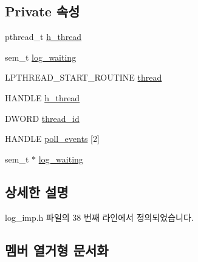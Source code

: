 \subsection*{Private 속성}
\begin{DoxyCompactItemize}
\item 
pthread\+\_\+t \hyperlink{classavdecc__lib_1_1log__imp_a6e4816698fce9da1e93d69ecbcc78506}{h\+\_\+thread}
\item 
sem\+\_\+t \hyperlink{classavdecc__lib_1_1log__imp_a5b9dda13ab4797605bff00be0df6d821}{log\+\_\+waiting}
\item 
L\+P\+T\+H\+R\+E\+A\+D\+\_\+\+S\+T\+A\+R\+T\+\_\+\+R\+O\+U\+T\+I\+NE \hyperlink{classavdecc__lib_1_1log__imp_aa930d342e4c53bcc9bf4da7995c81a3b}{thread}
\item 
H\+A\+N\+D\+LE \hyperlink{classavdecc__lib_1_1log__imp_a38f9e2153b3e3dadac999c7c45549cf6}{h\+\_\+thread}
\item 
D\+W\+O\+RD \hyperlink{classavdecc__lib_1_1log__imp_afb0cb0dfb6676a8802089b63ae981f37}{thread\+\_\+id}
\item 
H\+A\+N\+D\+LE \hyperlink{classavdecc__lib_1_1log__imp_a7178c7ad92d526f120bd0ae68b50f53e}{poll\+\_\+events} \mbox{[}2\mbox{]}
\item 
sem\+\_\+t $\ast$ \hyperlink{classavdecc__lib_1_1log__imp_a45d4efb00d197ef55a21c76abd9f02f5}{log\+\_\+waiting}
\end{DoxyCompactItemize}


\subsection{상세한 설명}


log\+\_\+imp.\+h 파일의 38 번째 라인에서 정의되었습니다.



\subsection{멤버 열거형 문서화}
